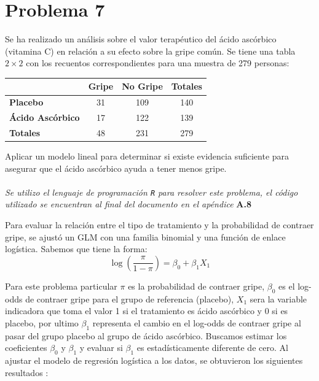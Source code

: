 \section*{Problema \textcolor{CIMATRed}{7}}

Se ha realizado un análisis sobre el valor terapéutico del ácido ascórbico (vitamina C) en relación a su efecto sobre la gripe común. Se tiene una tabla $2 \times 2$ con los recuentos correspondientes para una muestra de 279 personas:

\begin{center}
\begin{tabular}{l ccc}
\toprule
& \textbf{Gripe} & \textbf{No Gripe} & \textbf{Totales} \\
\midrule
\textbf{Placebo} & 31 & 109 & 140 \\
\textbf{Ácido Ascórbico} & 17 & 122 & 139 \\
\midrule
\textbf{Totales} & 48 & 231 & 279 \\
\bottomrule
\end{tabular}
\end{center}

Aplicar un modelo lineal para determinar si existe evidencia suficiente para asegurar que el ácido ascórbico ayuda a tener menos gripe.\\

\noindent{}\\

\textit{Se utilizo el lenguaje de programación \texttt{R} para resolver este problema, el código utilizado se encuentran al final del documento en el apéndice} \textbf{A.8}

Para evaluar la relación entre el tipo de tratamiento y la probabilidad de contraer gripe, se ajustó un GLM con una familia binomial y una función de enlace logística. Sabemos que tiene la forma:
\begin{equation}
    \log\left(\frac{\pi}{1-\pi}\right) = \beta_0 + \beta_1 X_1
\end{equation}

Para este problema particular $\pi$ es la probabilidad de contraer gripe, $\beta_0$ es el log-odds de contraer gripe para el grupo de referencia (placebo), $X_1$ sera la variable indicadora que toma el valor 1 si el tratamiento es ácido ascórbico y 0 si es placebo, por ultimo $\beta_1$ representa el cambio en el log-odds de contraer gripe al pasar del grupo placebo al grupo de ácido ascórbico. Buscamos estimar los coeficientes $\beta_0$ y $\beta_1$ y evaluar si $\beta_1$ es estadísticamente diferente de cero. Al ajustar el modelo de regresión logística a los datos, se obtuvieron los siguientes resultados :


